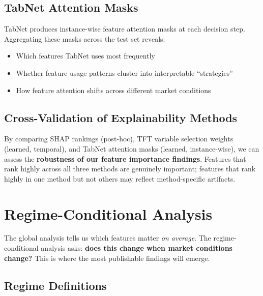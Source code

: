 \documentclass[11pt,a4paper]{article}
\begin{document}
\subsection{TabNet Attention Masks}

TabNet produces instance-wise feature attention masks at each decision step. Aggregating these masks across the test set reveals:
\begin{itemize}[nosep]
    \item Which features TabNet uses most frequently
    \item Whether feature usage patterns cluster into interpretable ``strategies''
    \item How feature attention shifts across different market conditions
\end{itemize}

\subsection{Cross-Validation of Explainability Methods}

\begin{keyinsight}
By comparing SHAP rankings (post-hoc), TFT variable selection weights (learned, temporal), and TabNet attention masks (learned, instance-wise), we can assess the \textbf{robustness of our feature importance findings}. Features that rank highly across all three methods are genuinely important; features that rank highly in one method but not others may reflect method-specific artifacts.
\end{keyinsight}


\section{Regime-Conditional Analysis}

The global analysis tells us which features matter \emph{on average}. The regime-conditional analysis asks: \textbf{does this change when market conditions change?} This is where the most publishable findings will emerge.

\subsection{Regime Definitions}
\end{document}
